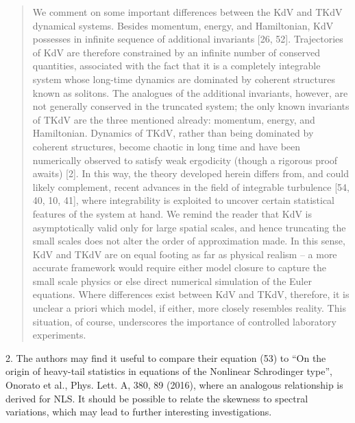 \documentclass[11pt]{article}
\newcommand{\comment}[1]{{\color{blue} #1}}
\begin{document}
\begin{itemize}
\begin{quotation}
We comment on some important differences between the KdV and TKdV dynamical systems. Besides momentum, energy, and Hamiltonian, KdV possesses in infinite sequence of additional invariants [26, 52]. Trajectories of KdV are therefore constrained by an infinite number of conserved quantities, associated with the fact that it is a completely integrable system whose long-time dynamics are dominated by coherent structures known as solitons. The analogues of the additional invariants, however, are not generally conserved in the truncated system; the only known invariants of TKdV are the three mentioned already: momentum, energy, and Hamiltonian. Dynamics of TKdV, rather than being dominated by coherent structures, become chaotic in long time and have been numerically observed to satisfy weak ergodicity (though a rigorous proof awaits) [2]. In this way, the theory developed herein differs from, and could likely complement, recent advances in the field of integrable turbulence [54, 40, 10, 41], where integrability is exploited to uncover certain statistical features of the system at hand. We remind the reader that KdV is asymptotically valid only for large spatial scales, and hence truncating the small scales does not alter the order of approximation made. In this sense, KdV and TKdV are on equal footing as far as physical realism – a more accurate framework would require either model closure to capture the small scale physics or else direct numerical simulation of the Euler equations. Where differences exist between KdV and TKdV, therefore, it is unclear a priori which model, if either, more closely resembles reality. This situation, of course, underscores the importance of controlled laboratory experiments.
\end{quotation}
\end{itemize}


\noindent
\comment{
2. The authors may find it useful to compare their equation (53) to
 ``On the origin of heavy-tail statistics in equations of the Nonlinear Schrodinger type'', Onorato et al., Phys. Lett. A, 380, 89 (2016), where an analogous relationship is derived for NLS. It should be possible to relate the skewness to spectral variations, which may lead to further interesting investigations.
}
\end{document}
